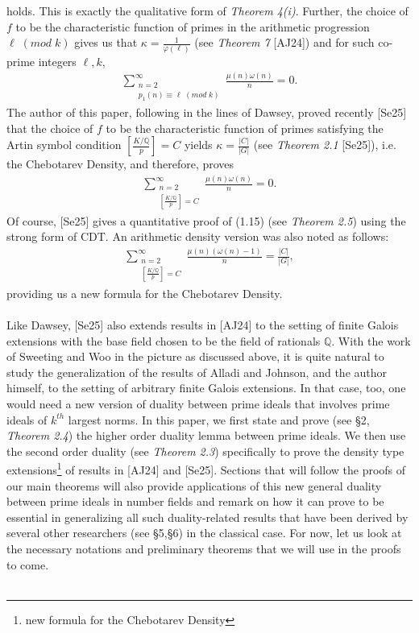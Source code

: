 \documentclass[12pt]{article}
\numberwithin{equation}{section}
\numberwithin{equation}{section}
\begin{document}
holds. This is exactly the qualitative form of \textit{Theorem 4(i)}. Further, the choice of $f$ to be the characteristic function of primes in the arithmetic progression $\ell\;(mod\;k)$ gives us that $\kappa = \frac{1}{\varphi(\ell)}$ (see \textit{Theorem 7} [AJ24]) and for such co-prime integers $\ell,k$,
\begin{align}
    \sum_{\substack{n=2 \\ p_1(n)\equiv \ell\;(mod\;k)}}^{\infty}\frac{\mu(n)\omega(n)}{n} =0.
\end{align}
The author of this paper, following in the lines of Dawsey, proved recently [Se25] that the choice of $f$ to be the characteristic function of primes satisfying the Artin symbol condition $\left[\frac{K/\mathbb{Q}}{p}\right]=C$ yields $\kappa=\frac{|C|}{|G|}$ (see \textit{Theorem 2.1} [Se25]), i.e. the Chebotarev Density, and therefore, proves
\begin{align}
     \sum_{\substack{n=2 \\ \left[\frac{K/\mathbb{Q}}{p}\right]=C}}^{\infty}\frac{\mu(n)\omega(n)}{n} =0.
\end{align}
Of course, [Se25] gives a quantitative proof of (1.15) (see \textit{Theorem 2.5}) using the strong form of CDT. An arithmetic density version was also noted as follows: 
\begin{align}
     \sum_{\substack{n=2 \\ \left[\frac{K/\mathbb{Q}}{p}\right]=C}}^{\infty}\frac{\mu(n)(\omega(n)-1)}{n} = \frac{|C|}{|G|}, \nonumber
\end{align}
providing us a new formula for the Chebotarev Density. \\ \\
Like Dawsey, [Se25] also extends results in [AJ24] to the setting of finite Galois extensions with the base field chosen to be the field of rationals $\mathbb{Q}$. With the work of Sweeting and Woo in the picture as discussed above, it is quite natural to study the generalization of the results of Alladi and Johnson, and the author himself, to the setting of arbitrary finite Galois extensions. In that case, too, one would need a new version of duality between prime ideals that involves prime ideals of $k^{th}$ largest norms. In this paper, we first state and prove (see \S 2, \textit{Theorem 2.4}) the higher order duality lemma between prime ideals. We then use the second order duality (see \textit{Theorem 2.3}) specifically to prove the density type extensions\footnote[2]{new formula for the Chebotarev Density} of results in [AJ24] and [Se25]. Sections that will follow the proofs of our main theorems will also provide applications of this new general duality between prime ideals in number fields and remark on how it can prove to be essential in generalizing all such duality-related results that have been derived by several other researchers (see \S5,\S6) in the classical case. For now, let us look at the necessary notations and preliminary theorems that we will use in the proofs to come. \\ \\
\end{document}

